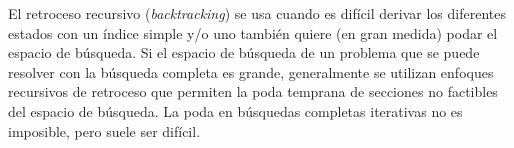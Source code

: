 El retroceso recursivo (\emph{backtracking}) se usa cuando es difícil derivar los diferentes estados con un índice simple y/o uno también quiere (en gran medida) podar el espacio de búsqueda. Si el espacio de búsqueda de un problema que se puede resolver con la búsqueda completa es grande, generalmente se utilizan enfoques recursivos de retroceso que permiten la poda temprana de secciones no factibles del espacio de búsqueda. La poda en búsquedas completas iterativas no es imposible, pero suele ser difícil.